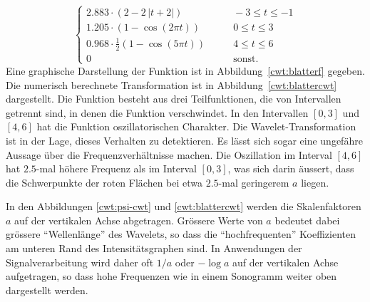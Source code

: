 \begin{beispiel}
\begin{equation}
\begin{cases}
2.883 \cdot (2 - 2\,|t+2|)&\qquad -3\le t \le -1\\
1.205\cdot (1-\cos(2\pi t))&\qquad 0\le t \le 3\\
0.968\cdot \frac12(1-\cos(5\pi t))&\qquad 4\le t \le 6\\
0&\qquad\text{sonst.}
\end{cases}
\label{cwt:blatterf}
\end{equation}
Eine graphische Darstellung der Funktion ist in Abbildung~\ref{cwt:blatterf}
gegeben.
Die numerisch berechnete Transformation ist in Abbildung~\ref{cwt:blattercwt}
dargestellt.
Die Funktion besteht aus drei Teilfunktionen, die von Intervallen getrennt sind,
in denen die Funktion verschwindet.
In den Intervallen $[0,3]$ und $[4,6]$ hat die Funktion oszillatorischen
Charakter.
Die Wavelet-Transformation ist in der Lage, dieses Verhalten zu detektieren.
Es lässt sich sogar eine ungefähre Aussage über die Frequenzverhältnisse
machen.
Die Oszillation im Interval $[4,6]$ hat $2.5$-mal höhere Frequenz als im
Interval $[0,3]$, was sich darin äussert, dass die Schwerpunkte der roten
Flächen bei etwa $2.5$-mal geringerem $a$ liegen.
\end{beispiel}

In den Abbildungen \ref{cwt:psi-cwt} und \ref{cwt:blattercwt} werden 
die Skalenfaktoren $a$ auf der vertikalen Achse abgetragen.
Grössere Werte von $a$ bedeutet dabei grössere ``Wellenlänge'' des Wavelets,
so dass die ``hochfrequenten'' Koeffizienten am unteren Rand des
Intensitätsgraphen sind.
In Anwendungen der Signalverarbeitung wird daher oft $1/a$ oder $-\log a$ 
auf der vertikalen Achse aufgetragen, so dass hohe Frequenzen wie in
einem Sonogramm weiter oben dargestellt werden.


